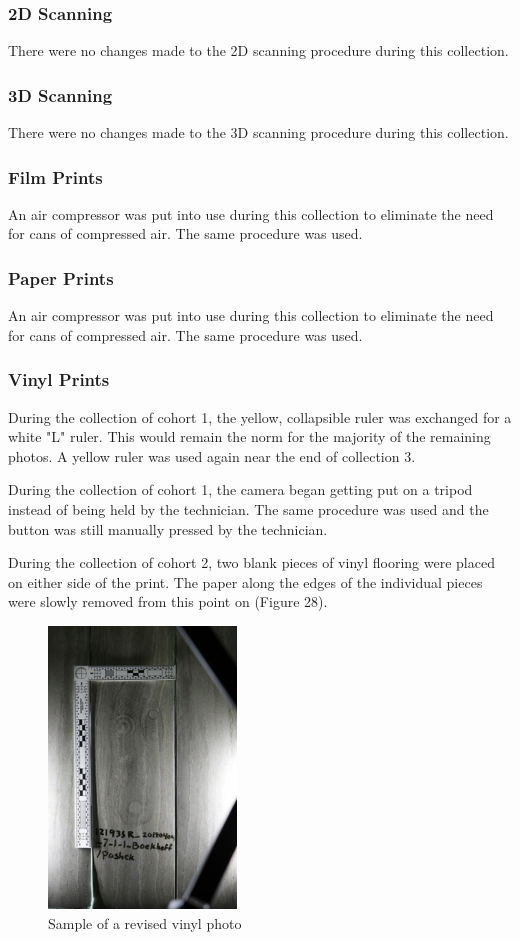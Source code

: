 \newpage

\subsubsection{2D Scanning}
There were no changes made to the 2D scanning procedure during this collection.

\subsubsection{3D Scanning}
There were no changes made to the 3D scanning procedure during this collection.

\subsubsection{Film Prints}
An air compressor was put into use during this collection to eliminate the need for cans of compressed air. The same procedure was used.

\subsubsection{Paper Prints}
An air compressor was put into use during this collection to eliminate the need for cans of compressed air. The same procedure was used.
\subsubsection{Vinyl Prints}
   During the collection of cohort 1, the yellow, collapsible ruler was exchanged for a white "L" ruler. This would remain the norm for the majority of the remaining photos. A yellow ruler was used again near the end of collection 3. 

   During the collection of cohort 1, the camera began getting put on a tripod instead of being held by the technician. The same procedure was used and the button was still manually pressed by the technician. 
   
   During the collection of cohort 2, two blank pieces of vinyl flooring were placed on either side of the print. The paper along the edges of the individual pieces were slowly  removed from this point on (Figure 28). 
   
\begin{figure}[!htp]
\centering
\includegraphics[width=5cm]{New_Vinyl}
\caption{Sample of a revised vinyl photo}
\label{Image 28}
\end{figure}

